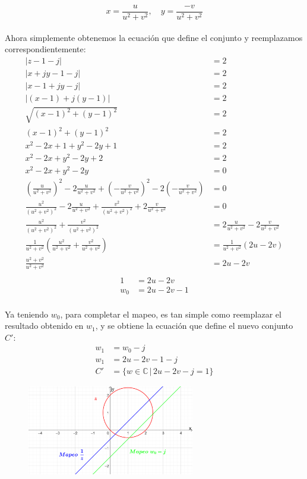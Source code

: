 \documentclass[12pt]{report}
\begin{document}
$$ x = \frac{u}{u^2 + v^2}, \quad y = \frac{-v}{u^2 + v^2} $$\\[6pt]
Ahora simplemente obtenemos la ecuación que define el conjunto y reemplazamos correspondientemente:\\
\begin{align*}
|z-1-j| &= 2 \\[6pt]
|x+jy-1-j|  &= 2 \\[6pt]
|x-1+jy-j| &= 2 \\[6pt]
|(x-1)+j(y-1)| &= 2 \\[6pt]
  \sqrt{(x-1)^2 + (y-1)^2} &= 2 \\[6pt]
(x-1)^2 + (y-1)^2 &= 2 \\[6pt]
x^2 - 2x + 1 + y^2 - 2y + 1 &= 2 \\[6pt]
x^2 - 2x + y^2 - 2y + 2 &= 2 \\[6pt]
x^2 - 2x + y^2 - 2y &= 0 \\[6pt]
   \left(\frac{u}{u^2+v^2} \right)^2 - 2\frac{u}{u^2+v^2} + \left( -\frac{v}{u^2+v^2} \right)^2-2 \left( -\frac{v}{u^2+v^2} \right) &=0\\[6pt]
   \frac{u^2}{(u^2+v^2)^2}-2\frac{u}{u^2+v^2} + \frac{v^2}{(u^2+v^2)^2}+2\frac{v}{u^2+v^2}&=0\\[6pt]
\frac{u^2}{(u^2+v^2)^2}+\frac{v^2}{(u^2+v^2)^2}&=2\frac{u}{u^2+v^2} - 2 \frac{v}{u^2+v^2}\\[6pt]
   \frac{1}{u^2+v^2} \left( \frac{u^2}{u^2+v^2} + \frac{v^2}{u^2+v^2} \right) &= \frac{1}{u^2+v^2}(2u-2v)\\[6pt]
   \frac{u^2+v^2}{u^2+v^2}&=2u-2v\\[6pt]
\end{align*}
\begin{align*}
     1 &= 2u - 2v \\[6pt]
    w_0 &= 2u - 2v - 1\\[6pt]
 \end{align*}
 
 Ya teniendo $w_0$, para completar el mapeo, es tan simple como reemplazar el resultado obtenido en $w_1$, y se obtiene la ecuación que define el nuevo conjunto \( C' \):\\
 
 
 \begin{align*}
     w_1 &= w_0-j \\[5pt]
     w_1 &= 2u-2v-1-j \\[5pt]
     C' &= \{w \in \mathbb{C} \, | \, 2u-2v-j=1\}
 \end{align*}
 
 
\begin{figure}[htbp] %
    \centering %
    \includegraphics[width=0.65\textwidth]{./Imagenes/foto2Ej3.png} %
\end{figure}
\end{document}
